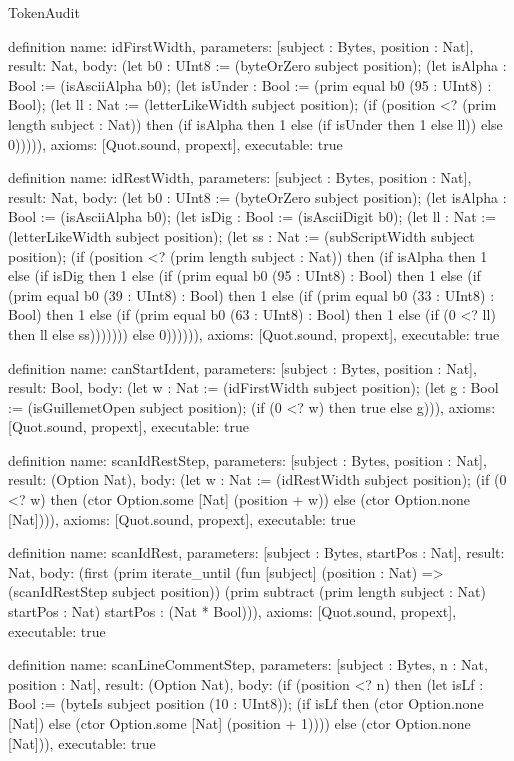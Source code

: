 \begin{lexlean}{TokenAudit}
\begin{semanticmodule}
definition{
  name: idFirstWidth,
  parameters: [subject : Bytes, position : Nat],
  result: Nat,
  body: (let b0 : UInt8 := (byteOrZero subject position); (let isAlpha : Bool := (isAsciiAlpha b0); (let isUnder : Bool := (prim equal b0 (95 : UInt8) : Bool); (let ll : Nat := (letterLikeWidth subject position); (if (position <? (prim length subject : Nat)) then (if isAlpha then 1 else (if isUnder then 1 else ll)) else 0))))),
  axioms: [Quot.sound, propext],
  executable: true
}

definition{
  name: idRestWidth,
  parameters: [subject : Bytes, position : Nat],
  result: Nat,
  body: (let b0 : UInt8 := (byteOrZero subject position); (let isAlpha : Bool := (isAsciiAlpha b0); (let isDig : Bool := (isAsciiDigit b0); (let ll : Nat := (letterLikeWidth subject position); (let ss : Nat := (subScriptWidth subject position); (if (position <? (prim length subject : Nat)) then (if isAlpha then 1 else (if isDig then 1 else (if (prim equal b0 (95 : UInt8) : Bool) then 1 else (if (prim equal b0 (39 : UInt8) : Bool) then 1 else (if (prim equal b0 (33 : UInt8) : Bool) then 1 else (if (prim equal b0 (63 : UInt8) : Bool) then 1 else (if (0 <? ll) then ll else ss))))))) else 0)))))),
  axioms: [Quot.sound, propext],
  executable: true
}

definition{
  name: canStartIdent,
  parameters: [subject : Bytes, position : Nat],
  result: Bool,
  body: (let w : Nat := (idFirstWidth subject position); (let g : Bool := (isGuillemetOpen subject position); (if (0 <? w) then true else g))),
  axioms: [Quot.sound, propext],
  executable: true
}

definition{
  name: scanIdRestStep,
  parameters: [subject : Bytes, position : Nat],
  result: (Option Nat),
  body: (let w : Nat := (idRestWidth subject position); (if (0 <? w) then (ctor Option.some [Nat] (position + w)) else (ctor Option.none [Nat]))),
  axioms: [Quot.sound, propext],
  executable: true
}

definition{
  name: scanIdRest,
  parameters: [subject : Bytes, startPos : Nat],
  result: Nat,
  body: (first (prim iterate_until (fun [subject] (position : Nat) => (scanIdRestStep subject position)) (prim subtract (prim length subject : Nat) startPos : Nat) startPos : (Nat * Bool))),
  axioms: [Quot.sound, propext],
  executable: true
}

definition{
  name: scanLineCommentStep,
  parameters: [subject : Bytes, n : Nat, position : Nat],
  result: (Option Nat),
  body: (if (position <? n) then (let isLf : Bool := (byteIs subject position (10 : UInt8)); (if isLf then (ctor Option.none [Nat]) else (ctor Option.some [Nat] (position + 1)))) else (ctor Option.none [Nat])),
  executable: true
}


\end{semanticmodule}
\end{lexlean}
